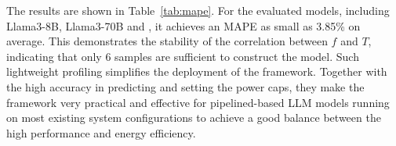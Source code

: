 The results are shown in Table~\ref{tab:mape}. 
For the evaluated models, including Llama3-8B, Llama3-70B and , it achieves an MAPE as small as 3.85\% on average.
This demonstrates the stability of the correlation between $f$ and $T$, indicating that only 6 samples are sufficient to construct the model. 
Such lightweight profiling simplifies the deployment of the \thisproj{} framework.
Together with the high accuracy in predicting and setting the power caps, they make the \thisproj{} framework very practical and effective for pipelined-based LLM models running on most existing system configurations to achieve a good balance between the high performance and energy efficiency.
